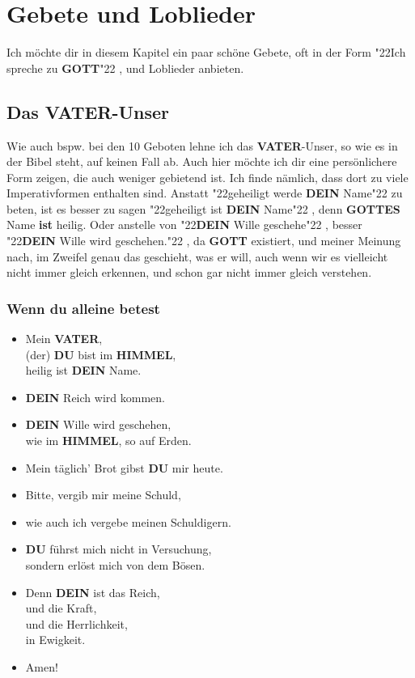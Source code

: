 \documentclass[10pt,a5paper]{article}
\newcommand{\Dein}[0]{\textbf{DEIN}}
\newcommand{\Du}[0]{\textbf{DU}}
\newcommand{\Gottes}[0]{\textbf{GOTTES}}
\newcommand{\Gott}[0]{\textbf{GOTT}}
\newcommand{\Himmel}[0]{\textbf{HIMMEL}}
\newcommand{\Vater}[0]{\textbf{VATER}}
\newcommand{\q}[1]{\char"22{#1}\char"22 }
\begin{document}
	\newpage
	\section{Gebete und Loblieder}
		Ich m\"ochte dir in diesem Kapitel ein paar sch\"one Gebete,
		oft in der Form \q{Ich spreche zu {\Gott}},
		und Loblieder anbieten.	
	
	\subsection{Das {\Vater}-Unser}
		Wie auch bspw. bei den 10 Geboten lehne ich das {\Vater}-Unser,
		so wie es in der Bibel steht,
		auf keinen Fall ab.
		Auch hier m\"ochte ich dir eine pers\"onlichere Form zeigen,
		die auch weniger gebietend ist.
		Ich finde n\"amlich,
		dass dort zu viele Imperativformen enthalten sind.
		Anstatt \q{geheiligt werde {\Dein} Name} zu beten,
		ist es besser zu sagen \q{geheiligt ist {\Dein} Name},
		denn {\Gottes} Name \textbf{ist} heilig.
		Oder anstelle von \q{{\Dein} Wille geschehe},
		besser \q{{\Dein} Wille wird geschehen.},
		da {\Gott} existiert,
		und meiner Meinung nach,
		im Zweifel genau das geschieht,
		was er will,
		auch wenn wir es vielleicht nicht immer gleich erkennen,
		und schon gar nicht immer gleich verstehen.
	
	\subsubsection{Wenn du alleine betest}
		\begin{itemize}[nosep]
			\item	Mein {\Vater},
			\\		(der) {\Du} bist im {\Himmel},
			\\		heilig ist {\Dein} Name.
			\item	{\Dein} Reich wird kommen.
			\item	{\Dein} Wille wird geschehen,
			\\		wie im {\Himmel},
					so auf Erden.
			\item	Mein t\"aglich' Brot gibst {\Du} mir heute.
			\item	Bitte,
					vergib mir meine Schuld,
			\item	wie auch ich vergebe meinen Schuldigern.
			\item	{\Du} f\"uhrst mich nicht in Versuchung,
			\\		sondern erl\"ost mich von dem B\"osen.
			\item	Denn {\Dein} ist das Reich,
			\\		und die Kraft,
			\\		und die Herrlichkeit,
			\\		in Ewigkeit.
			\item	Amen!
		\end{itemize}
			
\end{document}
